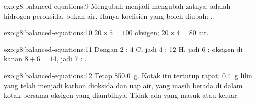 \begin{solution}{exo:g8:balanced-equations:9}
Mengubah  menjadi  mengubah zatnya:  adalah
hidrogen peroksida, bukan air. Hanya koefisien yang boleh diubah:
.
\end{solution}

\begin{solution}{exo:g8:balanced-equations:10}
$20 \times 5 = 100$  oksigen; $20 \times 4 = 80$  air.
\end{solution}

\begin{solution}{exo:g8:balanced-equations:11}
Dengan 2 : 4 C, jadi 4 ; 12 H, jadi 6 ; oksigen
di kanan $8 + 6 = 14$, jadi 7 :
.
\end{solution}

\begin{solution}{exo:g8:balanced-equations:12}
Tetap \qty{850.0}{g}. Kotak itu tertutup rapat: \qty{0.4}{g} lilin yang
 telah menjadi karbon dioksida dan uap air, yang masih berada di
dalam kotak bersama oksigen yang diambilnya. Tidak ada yang masuk atau
keluar.
\end{solution}

